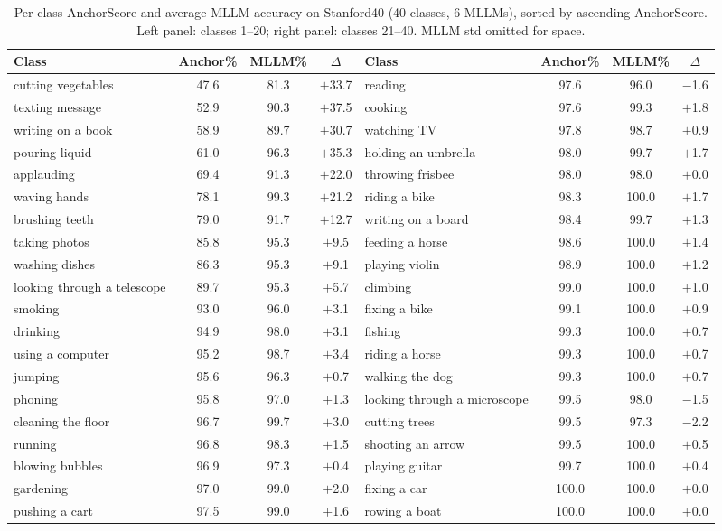 \documentclass[a4paper,fleqn]{cas-sc}
\begin{document}
\begin{table}[t]
\caption{Per-class AnchorScore and average MLLM accuracy on Stanford40 (40 classes, 6 MLLMs), sorted by ascending AnchorScore. Left panel: classes 1--20; right panel: classes 21--40. MLLM std omitted for space.}
\label{tab:stanford40_per_class}
\centering
\footnotesize
\setlength{\tabcolsep}{3pt}
\begin{tabular}{lccc@{\hspace{1.8em}}lccc}
\toprule
\textbf{Class} & \textbf{Anchor\%} & \textbf{MLLM\%} & $\Delta$ & \textbf{Class} & \textbf{Anchor\%} & \textbf{MLLM\%} & $\Delta$ \\
\midrule
cutting vegetables & 47.6 & 81.3 & $+$33.7 & reading & 97.6 & 96.0 & $-$1.6 \\
texting message & 52.9 & 90.3 & $+$37.5 & cooking & 97.6 & 99.3 & $+$1.8 \\
writing on a book & 58.9 & 89.7 & $+$30.7 & watching TV & 97.8 & 98.7 & $+$0.9 \\
pouring liquid & 61.0 & 96.3 & $+$35.3 & holding an umbrella & 98.0 & 99.7 & $+$1.7 \\
applauding & 69.4 & 91.3 & $+$22.0 & throwing frisbee & 98.0 & 98.0 & $+$0.0 \\
waving hands & 78.1 & 99.3 & $+$21.2 & riding a bike & 98.3 & 100.0 & $+$1.7 \\
brushing teeth & 79.0 & 91.7 & $+$12.7 & writing on a board & 98.4 & 99.7 & $+$1.3 \\
taking photos & 85.8 & 95.3 & $+$9.5 & feeding a horse & 98.6 & 100.0 & $+$1.4 \\
washing dishes & 86.3 & 95.3 & $+$9.1 & playing violin & 98.9 & 100.0 & $+$1.2 \\
looking through a telescope & 89.7 & 95.3 & $+$5.7 & climbing & 99.0 & 100.0 & $+$1.0 \\
smoking & 93.0 & 96.0 & $+$3.1 & fixing a bike & 99.1 & 100.0 & $+$0.9 \\
drinking & 94.9 & 98.0 & $+$3.1 & fishing & 99.3 & 100.0 & $+$0.7 \\
using a computer & 95.2 & 98.7 & $+$3.4 & riding a horse & 99.3 & 100.0 & $+$0.7 \\
jumping & 95.6 & 96.3 & $+$0.7 & walking the dog & 99.3 & 100.0 & $+$0.7 \\
phoning & 95.8 & 97.0 & $+$1.3 & looking through a microscope & 99.5 & 98.0 & $-$1.5 \\
cleaning the floor & 96.7 & 99.7 & $+$3.0 & cutting trees & 99.5 & 97.3 & $-$2.2 \\
running & 96.8 & 98.3 & $+$1.5 & shooting an arrow & 99.5 & 100.0 & $+$0.5 \\
blowing bubbles & 96.9 & 97.3 & $+$0.4 & playing guitar & 99.7 & 100.0 & $+$0.4 \\
gardening & 97.0 & 99.0 & $+$2.0 & fixing a car & 100.0 & 100.0 & $+$0.0 \\
pushing a cart & 97.5 & 99.0 & $+$1.6 & rowing a boat & 100.0 & 100.0 & $+$0.0 \\
\bottomrule
\end{tabular}
\end{table}
\end{document}
